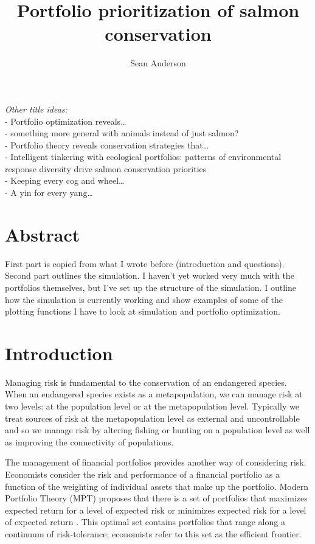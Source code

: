 \documentclass[12pt]{article}
\title{Portfolio prioritization of salmon conservation}
\author{Sean Anderson}
\date{}
\begin{document}
\maketitle

\emph{Other title ideas:}\\- Portfolio optimization reveals\ldots{}\\-
something more general with animals instead of just salmon?\\- Portfolio
theory reveals conservation strategies that\ldots{}\\- Intelligent
tinkering with ecological portfolios: patterns of environmental response
diversity drive salmon conservation priorities\\- Keeping every cog and
wheel\ldots{}\\- A yin for every yang\ldots{}

\section{Abstract}

First part is copied from what I wrote before (introduction and
questions). Second part outlines the simulation. I haven't yet worked
very much with the portfolios themselves, but I've set up the structure
of the simulation. I outline how the simulation is currently working and
show examples of some of the plotting functions I have to look at
simulation and portfolio optimization.

\section{Introduction}

Managing risk is fundamental to the conservation of an endangered
species. When an endangered species exists as a metapopulation, we can
manage risk at two levels: at the population level or at the
metapopulation level. Typically we treat sources of risk at the
metapopulation level as external and uncontrollable and so we manage
risk by altering fishing or hunting on a population level as well as
improving the connectivity of populations.

The management of financial portfolios provides another way of
considering risk. Economists consider the risk and performance of a
financial portfolio as a function of the weighting of individual assets
that make up the portfolio. Modern Portfolio Theory (MPT) proposes that
there is a set of portfolios that maximizes expected return for a level
of expected risk or minimizes expected risk for a level of expected
return \citep{Markowitz1952, Markowitz1959}. This optimal set contains
portfolios that range along a continuum of risk-tolerance; economists
refer to this set as the efficient frontier.
\end{document}
